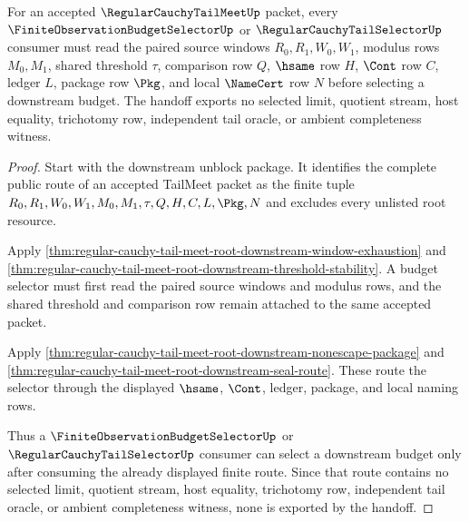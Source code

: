 \begin{theorem}
\label{thm:regular-cauchy-tail-meet-budget-selector-handoff}
For an accepted $\RegularCauchyTailMeetUp$ packet, every
$\FiniteObservationBudgetSelectorUp$ or $\RegularCauchyTailSelectorUp$ consumer
must read the paired source windows $R_0,R_1,W_0,W_1$, modulus rows $M_0,M_1$,
shared threshold $\tau$, comparison row $Q$, $\hsame$ row $H$, $\Cont$ row $C$,
ledger $L$, package row $\Pkg$, and local $\NameCert$ row $N$ before selecting a
downstream budget. The handoff exports no selected limit, quotient stream, host
equality, trichotomy row, independent tail oracle, or ambient completeness
witness.
\end{theorem}
\begin{proof}
Start with the downstream unblock package. It identifies the complete public
route of an accepted TailMeet packet as the finite tuple
$R_0,R_1,W_0,W_1,M_0,M_1,\tau,Q,H,C,L,\Pkg,N$ and excludes every unlisted root
resource.

Apply
\autoref{thm:regular-cauchy-tail-meet-root-downstream-window-exhaustion} and
\autoref{thm:regular-cauchy-tail-meet-root-downstream-threshold-stability}. A
budget selector must first read the paired source windows and modulus rows, and
the shared threshold and comparison row remain attached to the same accepted
packet.

Apply
\autoref{thm:regular-cauchy-tail-meet-root-downstream-nonescape-package} and
\autoref{thm:regular-cauchy-tail-meet-root-downstream-seal-route}. These route
the selector through the displayed $\hsame$, $\Cont$, ledger, package, and
local naming rows.

Thus a $\FiniteObservationBudgetSelectorUp$ or
$\RegularCauchyTailSelectorUp$ consumer can select a downstream budget only
after consuming the already displayed finite route. Since that route contains no
selected limit, quotient stream, host equality, trichotomy row, independent tail
oracle, or ambient completeness witness, none is exported by the handoff.
\end{proof}

